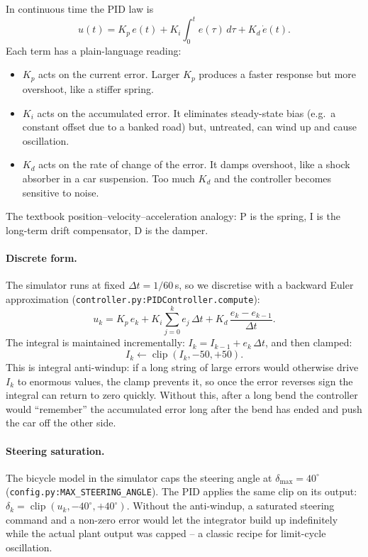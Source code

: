 In continuous time the PID law is
\[
u(t) = K_p\,e(t) + K_i\int_0^t e(\tau)\,d\tau + K_d\,\dot e(t).
\]
Each term has a plain-language reading:
\begin{itemize}[leftmargin=1.4em,itemsep=2pt]
  \item $K_p$ acts on the current error. Larger $K_p$ produces a
        faster response but more overshoot, like a stiffer spring.
  \item $K_i$ acts on the accumulated error. It eliminates
        steady-state bias (e.g.\ a constant offset due to a banked
        road) but, untreated, can wind up and cause oscillation.
  \item $K_d$ acts on the rate of change of the error. It damps
        overshoot, like a shock absorber in a car suspension. Too much
        $K_d$ and the controller becomes sensitive to noise.
\end{itemize}
The textbook position--velocity--acceleration analogy: P is the
spring, I is the long-term drift compensator, D is the damper.

\paragraph{Discrete form.}
The simulator runs at fixed $\Delta t=1/60$\,s, so we discretise with
a backward Euler approximation
(\texttt{controller.py:PIDController.compute}):
\[
u_k = K_p\,e_k + K_i\sum_{j=0}^{k}e_j\,\Delta t + K_d\,\frac{e_k - e_{k-1}}{\Delta t}.
\]
The integral is maintained incrementally:
$I_k = I_{k-1} + e_k\,\Delta t$, and then clamped:
\[
I_k\leftarrow\operatorname{clip}(I_k,-50,+50).
\]
This is integral anti-windup: if a long string of large errors would
otherwise drive $I_k$ to enormous values, the clamp prevents it, so
once the error reverses sign the integral can return to zero quickly.
Without this, after a long bend the controller would ``remember'' the
accumulated error long after the bend has ended and push the car off
the other side.

\paragraph{Steering saturation.}
The bicycle model in the simulator caps the steering angle at
$\delta_{\max}=40^\circ$ (\texttt{config.py:MAX\_STEERING\_ANGLE}).
The PID applies the same clip on its output:
$\delta_k = \operatorname{clip}(u_k,-40^\circ,+40^\circ)$. Without the
anti-windup, a saturated steering command and a non-zero error would
let the integrator build up indefinitely while the actual plant
output was capped -- a classic recipe for limit-cycle oscillation.

